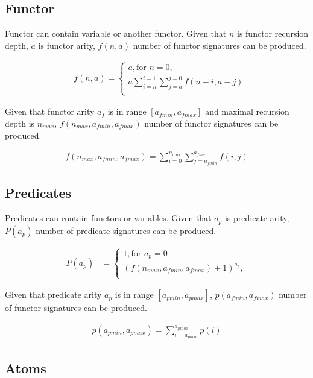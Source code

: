\subsection{Functor}

Functor can contain variable or another functor.
Given that
$n$ is functor recursion depth,
$a$ is functor arity,
$f(n, a)$ number of functor signatures can be produced.

\begin{align}
	&f(n, a) =
	\begin{cases}
    a, \text{for } n = 0, \\
		a \sum_{i=n}^{i=1} \sum_{j=a}^{j=0} f(n-i,a-j) \\
	\end{cases}
\end{align}

Given that functor arity $a_f$ is in range $[a_{fmin}, a_{fmax}]$  and maximal recursion depth is $n_{max}$, $f(n_{max}, a_{fmin}, a_{fmax})$ number of functor signatures can be produced.

\begin{align}
  f(n_{max}, a_{fmin}, a_{fmax}) = \sum_{i=0}^{n_{max}} \sum_{j=a_{fmin}}^{a_{fmax}} f(i, j) \label{eq:functor}
\end{align}

\subsection{Predicates}

Predicates can contain functors or variables.
Given that $a_p$ is predicate arity, $P(a_p)$ number of predicate signatures can be produced.

\begin{align}
	P(a_p) &=
	\begin{cases}
		1, \text{for } a_p = 0 \\
		(f(n_{max}, a_{fmin}, a_{fmax}) + 1)^{a_p}, \\
	\end{cases}
\end{align}

Given that predicate arity $a_p$ is in range $[a_{pmin}, a_{pmax}]$, $p(a_{fmin}, a_{fmax})$ number of functor signatures can be produced.

\begin{align}
  p(a_{pmin}, a_{pmax}) = \sum_{i=a_{pmin}}^{a_{pmax}} p(i) \label{eq:predicate}
\end{align}

\subsection{Atoms}


